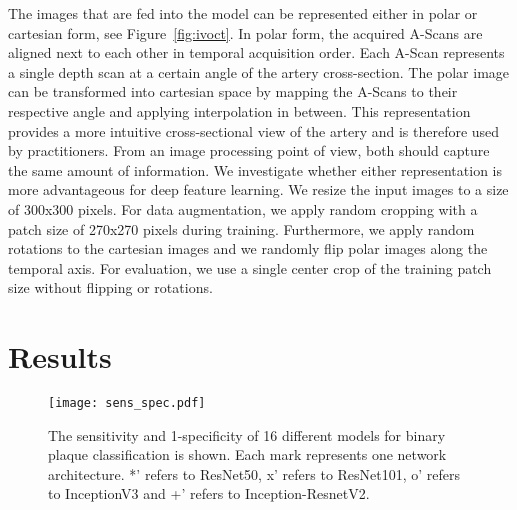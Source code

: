 The images that are fed into the model can be represented either in polar or cartesian form, see Figure~\ref{fig:ivoct}. In polar form, the acquired A-Scans are aligned next to each other in temporal acquisition order. Each A-Scan represents a single depth scan at a certain angle of the artery cross-section. The polar image can be transformed into cartesian space by mapping the A-Scans to their respective angle and applying interpolation in between. This representation provides a more intuitive cross-sectional view of the artery and is therefore used by practitioners. From an image processing point of view, both should capture the same amount of information. We investigate whether either representation is more advantageous for deep feature learning.
We resize the input images to a size of 300x300 pixels. For data augmentation, we apply random cropping with a patch size of 270x270 pixels during training. Furthermore, we apply random rotations to the cartesian images and we randomly flip polar images along the temporal axis. For evaluation, we use a single center crop of the training patch size without flipping or rotations.

\section{Results}

\begin{figure*}
  \centering
  \texttt{[image: sens\_spec.pdf]}
\caption{The sensitivity and 1-specificity of 16 different models for binary plaque classification is shown. Each mark represents one network architecture. *’ refers to ResNet50, x’ refers to ResNet101, o’ refers to InceptionV3 and +’ refers to Inception-ResnetV2.}
\label{fig:res}       %
\end{figure*}

